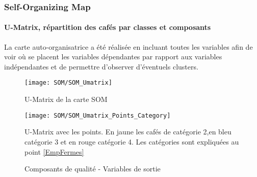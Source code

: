 \newpage
\subsubsection{Self-Organizing Map}

\paragraph{U-Matrix, répartition des cafés par classes et composants} 
La carte auto-organisatrice a été réalisée en incluant toutes les variables afin de voir où se placent les variables dépendantes par rapport aux variables indépendantes et de permettre d'observer d'éventuels clusters. 


\begin{figure}[H]
	\centering
	\texttt{[image: SOM/SOM\_Umatrix]}
	\caption{U-Matrix de la carte SOM}
	\label{}
\end{figure}

\begin{figure}[H]
	\centering
	\texttt{[image: SOM/SOM\_Umatrix\_Points\_Category]}
	\caption{U-Matrix avec les points. En jaune les cafés de catégorie 2,en bleu catégorie 3 et en rouge catégorie 4. Les catégories sont expliquées au point \ref{EmpFermes}}
	\label{}
\end{figure}


\begin{figure}[H]
	\caption{Composants de qualité - Variables de sortie}
	\centering
		\hfill
		\hfill
		\newline
		\hfill
		\hfill
		\newline
		\hfill
		\hfill
		\newline
		\centering
		\hfill
\end{figure}




